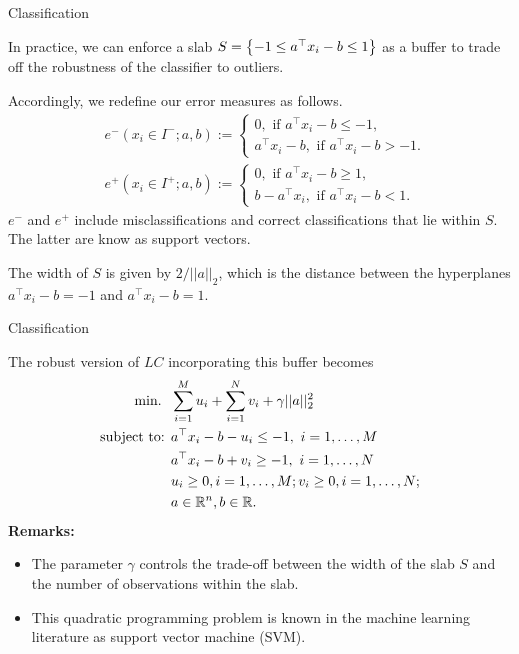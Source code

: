 \begin{frame}{Classification}

	In practice, we can enforce a \alert{slab} $S = \left\{ -1 \leq a^\top x_i- b \leq 1 \right \}$ as a buffer to trade off the \alert{robustness} of the classifier to outliers. 
	
	Accordingly, we redefine our error measures as follows. 
	\begin{align*}
	& e^-(x_i \in I^-; a, b) := 
	    \begin{cases} 0, \text{ if } a^\top x_i - b \leq -1, \\
	        a^\top x_i - b, \text{ if } a^\top x_i - b > -1.
	    \end{cases} \\
	& e^+(x_i \in I^+; a, b) := 
	    \begin{cases} 0, \text{ if } a^\top x_i - b \geq 1, \\
	        b -  a^\top x_i, \text{ if } a^\top x_i - b < 1.
	    \end{cases}                   
	\end{align*}
	\pause
	$e^-$ and $e^+$ include \alert{misclassifications} and \alert{correct classifications that lie within $S$}. The latter are know as \alert{support vectors}.
	
	The \alert{width of $S$ is given by $2/||a||_2$}, which is the distance between the hyperplanes $a^\top x_i - b = -1$ and $a^\top x_i - b = 1$.
	
\end{frame}


\begin{frame}{Classification}

	The robust version of $LC$ incorporating this buffer becomes   
	\begin{align*}
		\mathop{\text{min.} \ } \ & \sum_{i=1}^M u_i + \sum_{i=1}^N v_i + \gamma||a||_2^2\\
		\mbox{subject to: } & a^\top x_i - b - u_i \leq -1, \ i = 1,\dots,M \\
		& a^\top x_i - b + v_i \geq -1, \ i = 1,\dots,N \\
		& u_i \geq 0, i = 1,\dots,M; v_i \geq 0, i = 1,\dots, N; \\
		& a \in \mathbb R^n, b \in \mathbb R.
	\end{align*} 
	\pause
	{\bf Remarks:}
	\vspace{-6pt}
	\begin{itemize}[<+->]
		\item The parameter $\gamma$ controls the \alert{trade-off} between the width of the slab $S$ and the number of observations within the slab.
		\item This quadratic programming problem is known in the machine learning literature as \alert{support vector machine} (SVM).
	\end{itemize}

\end{frame}


